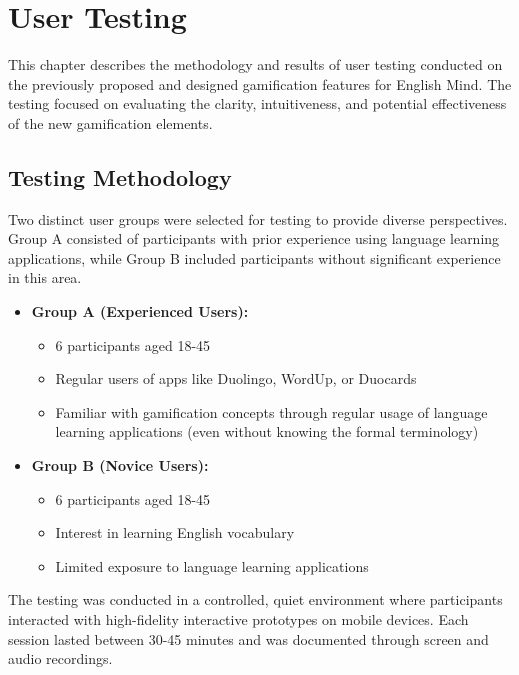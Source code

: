 \chapter{User Testing}

This chapter describes the methodology and results of user testing conducted on the previously proposed and designed gamification features for English Mind. The testing focused on evaluating the clarity, intuitiveness, and potential effectiveness of the new gamification elements.

\section{Testing Methodology}

Two distinct user groups were selected for testing to provide diverse perspectives. Group A consisted of participants with prior experience using language learning applications, while Group B included participants without significant experience in this area.

\begin{itemize}
    \item \textbf{Group A (Experienced Users):}
    \begin{itemize}
        \item 6 participants aged 18-45
        \item Regular users of apps like Duolingo, WordUp, or Duocards
        \item Familiar with gamification concepts through regular usage of language learning applications (even without knowing the formal terminology)
    \end{itemize}

    \item \textbf{Group B (Novice Users):}
    \begin{itemize}
        \item 6 participants aged 18-45
        \item Interest in learning English vocabulary
        \item Limited exposure to language learning applications
    \end{itemize}
\end{itemize}

The testing was conducted in a controlled, quiet environment where participants interacted with high-fidelity interactive prototypes on mobile devices. Each session lasted between 30-45 minutes and was documented through screen and audio recordings.

